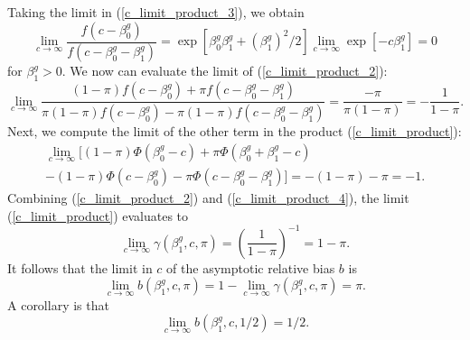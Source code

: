 \documentclass[12pt]{article}
\begin{document}
Taking the limit in (\ref{c_limit_product_3}), we obtain
$$
\lim_{c \to \infty} \frac{f(c - \beta^g_0)}{f(c - \beta^g_0 - \beta^g_1)} = \exp[ \beta^g_0 \beta^g_1 + (\beta^g_1)^2/2] \lim_{c \to \infty} \exp[ -c \beta^g_1] = 0
$$ for $\beta^g_1 > 0$. We now can evaluate the limit of (\ref{c_limit_product_2}):
$$ \lim_{c \to \infty} \frac{(1-\pi) f(c - \beta^g_0) + \pi f(c - \beta^g_0 - \beta^g_1)}{\pi (1-\pi) f(c - \beta^g_0) - \pi (1-\pi)f(c - \beta^g_0 - \beta^g_1)} = \frac{-\pi}{\pi(1-\pi)} = -\frac{1}{1 -\pi}.$$ Next, we compute the limit of the other term in the product (\ref{c_limit_product}):
\begin{multline}\label{c_limit_product_4}
\lim_{c \to \infty} \bigg[ (1-\pi)\Phi(\beta_0^g - c) + \pi \Phi(\beta^g_0 + \beta^g_1 - c) \\ - (1-\pi)\Phi(c - \beta^g_0) - \pi \Phi(c - \beta_0^g - \beta_1^g) \bigg] = -(1-\pi) - \pi = -1.
\end{multline}
Combining (\ref{c_limit_product_2}) and (\ref{c_limit_product_4}), the limit (\ref{c_limit_product}) evaluates to
$$ \lim_{c \to \infty} \gamma(\beta^g_1, c, \pi) = \left(  \frac{ 1 }{ 1 - \pi }\right)^{-1} = 1 - \pi.$$ It follows that the limit in $c$ of the asymptotic relative bias $b$ is
$$\lim_{c \to \infty} b(\beta^g_1, c, \pi) = 1 - \lim_{c \to \infty} \gamma(\beta^g_1, c, \pi) = \pi.$$
A corollary is that
$$\lim_{c \to \infty} b(\beta^g_1, c, 1/2) = 1/2.$$
\end{document}
